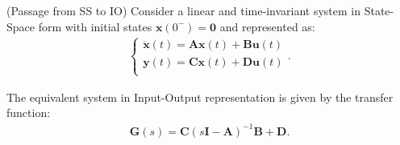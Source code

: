 \documentclass[a4paper,11pt]{book}
\numberwithin{figure}{chapter}
\numberwithin{equation}{chapter}
\numberwithin{table}{chapter}
\newtheorem{theorem}{Theorem}[chapter]
\theoremstyle{definition}
\newcounter{boxed-theorem}
\newenvironment{boxed-theorem}[1]
{\colorlet{shadecolor}{pastelBlue2!5} \begin{shaded} \begin{theorem}{#1}}
{\end{theorem} \end{shaded}}
\newcounter{boxed-lemma}
\newcounter{boxed-definition}
\newcounter{boxed-example}
\begin{document}
\begin{boxed-theorem}{(Passage from SS to IO)} \label{th:SSToIO}
    Consider a linear and time-invariant system in State-Space form with initial states $\bm{x}(0^-) = \bm{0}$ and represented as:
    \begin{align}
    \begin{cases}
        \dot{\bm{x}}(t) = \bm{A} \bm{x}(t) + \bm{B} \bm{u}(t) \\
        \bm{y}(t) = \bm{C} \bm{x}(t) + \bm{D} \bm{u}(t) \\
    \end{cases}     
    .\end{align}
    
\noindent The equivalent system in Input-Output representation is given by the transfer function:
    \begin{align}
    \bm{G}(s) = \bm{C} (s\bm{I} - \bm{A})^{-1} \bm{B} + \bm{D}
    .\end{align}
\end{boxed-theorem}
 
\end{document}
